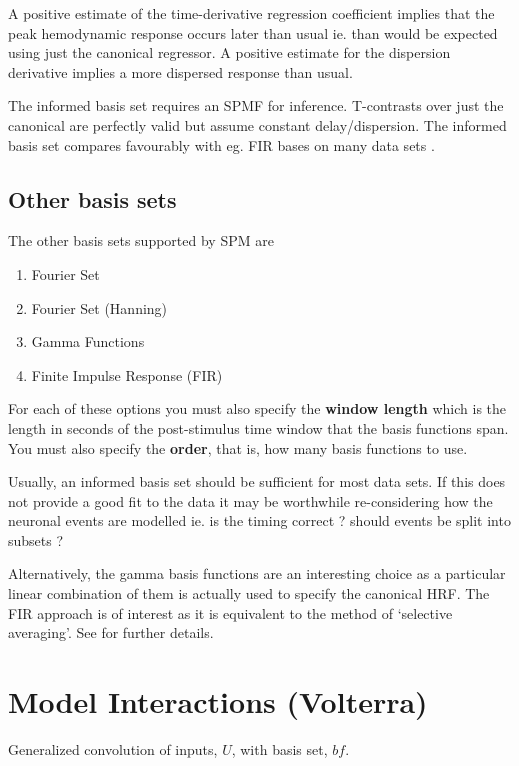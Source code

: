 A positive estimate of the time-derivative regression coefficient implies that the peak hemodynamic response occurs later than usual ie. than would be expected using just the canonical regressor. A positive estimate for the dispersion derivative implies a more dispersed response than usual.

The informed basis set requires an SPM{F} for inference. T-contrasts over just the canonical are perfectly valid but assume constant delay/dispersion. The informed basis set compares favourably with eg. FIR bases on many data sets \cite{rnah_basis}.

\subsection{Other basis sets}

The other basis sets supported by SPM are

\begin{enumerate}
\item{Fourier Set}
\item{Fourier Set (Hanning)}
\item{Gamma Functions}
\item{Finite Impulse Response (FIR)}
\end{enumerate}

For each of these options you must also specify the {\bf window length} which is the length in seconds of the post-stimulus time window that the basis functions span. You must also specify the {\bf order}, that is, how many basis functions to use.

Usually, an informed basis set should be sufficient for most data sets. If this does not provide a good fit to the data it may be worthwhile re-considering how the neuronal events are modelled ie. is the timing correct ? should events be split into subsets ? 

Alternatively, the gamma basis functions are an interesting choice as a particular linear combination of them is actually used to specify the canonical HRF. The FIR approach is of interest as it is equivalent to the method of `selective averaging'. See \cite{rnah_conv} for further details. 

\section{Model Interactions (Volterra)}

Generalized convolution of inputs, $U$, with basis set, $bf$.

